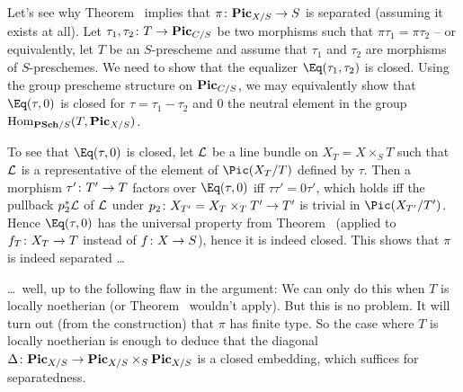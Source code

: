 \documentclass[a4paper,parskip=half,numbers=enddot, DIV=12]{scrreprt}
\begin{document}
\begin{rem}	 
		Let's see why Theorem~ implies that $\pi\colon \PIC_{X/S}\morphism S$ is separated (assuming it exists at all). Let $\tau_1,\tau_2\colon T\morphism\PIC_{C/S}$ be two morphisms such that $\pi\tau_1=\pi\tau_2$ -- or equivalently, let $T$ be an $S$-prescheme and assume that $\tau_1$ and $\tau_2$ are morphisms of $S$-preschemes. We need to show that the equalizer $\Eq(\tau_1,\tau_2)$ is closed. Using the group prescheme structure on $\mathbf{Pic}_{C/S}$, we may equivalently show that $\Eq(\tau,0)$ is closed for $\tau=\tau_1-\tau_2$ and $0$ the neutral element in the group $\Hom_{\cat{PSch}/S}(T,\PIC_{X/S})$.
		
		To see that $\Eq(\tau,0)$ is closed, let $\mathcal{L}$ be a line bundle on $X_T=X\times_ST$ such that $\mathcal{L}$ is a representative of the element of $\Pic(X_T/T)$ defined by $\tau$. Then a morphism $\tau'\colon T'\morphism T$ factors over $\Eq(\tau,0)$ iff $\tau\tau'=0\tau'$, which holds iff the pullback $p_2^*\mathcal{L}$ of $\mathcal{L}$ under $p_2\colon X_{T'}=X_T\times_TT'\morphism T'$ is trivial in $\Pic(X_{T'}/T')$. Hence $\Eq(\tau,0)$ has the universal property from Theorem~ (applied to $f_T\colon X_T\morphism T$ instead of $f\colon X\morphism S$), hence it is indeed closed. This shows that $\pi$ is indeed separated \ldots
		
		\ldots\ well, up to the following flaw in the argument: We can only do this when $T$ is locally noetherian (or Theorem~ wouldn't apply). But this is no problem. It will turn out (from the construction) that $\pi$ has finite type. So the case where $T$ is locally noetherian is enough to deduce that the diagonal $\Delta\colon\PIC_{X/S}\morphism\PIC_{X/S}\times_S\PIC_{X/S}$ is a closed embedding, which suffices for separatedness.
		

\end{rem}
\end{document}
